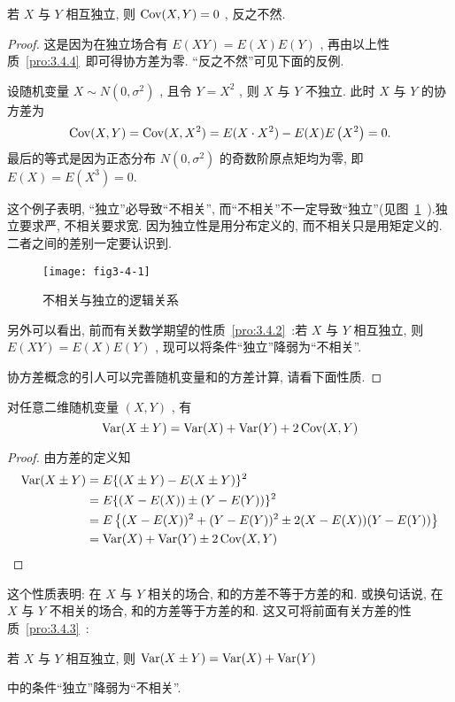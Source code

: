 	\begin{property}\label{pro:3.4.5}
		若 $X$ 与 $Y$ 相互独立, 则 $\operatorname{Cov}(X,Y)=0$ , 反之不然.
		\begin{proof}
			这是因为在独立场合有 $E(XY)=E(X)E(Y)$ , 再由以上性质~\ref{pro:3.4.4}~即可得协方差为零. “反之不然”可见下面的反例.
			\begin{example}\label{exam:3.4.6}
				设随机变量 $X \sim N\left(0,\sigma^2\right)$ , 且令 $Y=X^2$ , 则 $X$ 与 $Y$ 不独立. 此时 $X$ 与 $Y$ 的协方差为
				\begin{equation*}
					\operatorname{Cov}(X, Y)=\operatorname{Cov}(X, X^2)=E(X\cdot X^2)-E(X)E\left( X^2 \right)=0.
				\end{equation*}
				最后的等式是因为正态分布 $N\left(0,\sigma^2\right)$ 的奇数阶原点矩均为零, 即 $E(X)=E\left( X^3 \right)=0.$
			\end{example}
			这个例子表明, “独立”必导致“不相关”, 而“不相关”不一定导致“独立”(见图~\ref{fig:3.4.1}~).独立要求严, 不相关要求宽. 因为独立性是用分布定义的, 而不相关只是用矩定义的. 二者之间的差别一定要认识到.
			\begin{figure}[htbp]
				\centering
				\texttt{[image: fig3-4-1]}
				\caption{不相关与独立的逻辑关系}\label{fig:3.4.1}
			\end{figure}

			另外可以看出, 前而有关数学期望的性质~\ref{pro:3.4.2}~:若 $X$ 与 $Y$ 相互独立, 则 $E(XY)=E(X)E(Y)$ , 现可以将条件“独立”降弱为“不相关”.

			协方差概念的引人可以完善随机变量和的方差计算, 请看下面性质.
		\end{proof}
	\end{property}
	\begin{property}\label{pro:3.4.6}
		对任意二维随机变量 $(X,Y)$ , 有
		\begin{equation}\label{eq:3.4.8}
			\operatorname{Var}(X \pm Y)=\operatorname{Var}(X)+\operatorname{Var}(Y)+2 \operatorname{Cov}(X, Y)
		\end{equation}
		\begin{proof}
			由方差的定义知
			\begin{align*}
				\operatorname{Var}(X \pm Y)&=E\{(X \pm Y)-E(X \pm Y)\}^{2} \\
				&=E\{(X-E(X)) \pm(Y-E(Y))\}^{2} \\
				&=E\left\{(X-E(X))^{2}+(Y-E(Y))^{2} \pm 2(X-E(X))(Y-E(Y))\right\} \\
			  &=\operatorname{Var}(X)+\operatorname{Var}(Y) \pm 2 \operatorname{Cov}(X, Y)
			\end{align*}
		\end{proof}
	\end{property}
	这个性质表明: 在 $X$ 与 $Y$ 相关的场合, 和的方差不等于方差的和. 或换句话说, 在 $X$ 与 $Y$ 不相关的场合, 和的方差等于方差的和. 这又可将前面有关方差的性质~\ref{pro:3.4.3}~:
	\begin{center}
		若 $X$ 与 $Y$ 相互独立, 则 $\operatorname{Var}(X \pm Y)=\operatorname{Var}(X)+\operatorname{Var}(Y)$
	\end{center}
	中的条件“独立”降弱为“不相关”.

